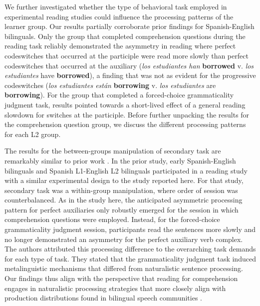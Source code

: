 \documentclass[output=paper,colorlinks,citecolor=brown]{langscibook}
\begin{document}
We further investigated whether the type of behavioral task employed in experimental reading studies could influence the processing patterns of the learner group. Our results partially corroborate prior findings for Spanish-English bilinguals. Only the group that completed comprehension questions during the reading task reliably demonstrated the asymmetry in reading where perfect codeswitches that occurred at the participle were read more slowly than perfect codeswitches that occurred at the auxiliary (\textit{los estudiantes han} \textbf{borrowed} v. \textit{los estudiantes} have \textbf{borrowed}), a finding that was not as evident for the progressive codeswitches (\textit{los estudiantes est\'an} \textbf{borrowing} v. \textit{los estudiantes} are \textbf{borrowing}). For the group that completed a forced-choice grammaticality judgment task, results pointed towards a short-lived effect of a general reading slowdown for switches at the participle. Before further unpacking the results for the comprehension question group, we discuss the different processing patterns for each L2 group.

The results for the between-groups manipulation of secondary task are remarkably similar to prior work \citep{ValdesKroffetal2018}. In the prior study, early Spanish-English bilinguals and Spanish L1-English L2 bilinguals participated in a reading study with a similar experimental design to the study reported here. For that study, secondary task was a within-group manipulation, where order of session was counterbalanced. As in the study here, the anticipated asymmetric processing pattern for perfect auxiliaries only robustly emerged for the session in which comprehension questions were employed. Instead, for the forced-choice grammaticality judgment session, participants read the sentences more slowly and no longer demonstrated an asymmetry for the perfect auxiliary verb complex. The authors attributed this processing difference to the overarching task demands for each type of task. They stated that the grammaticality judgment task induced metalinguistic mechanisms that differed from naturalistic sentence processing. Our findings thus align with the perspective that reading for comprehension engages in naturalistic processing strategies that more closely align with production distributions found in bilingual speech communities \citep{MacizoBajo2006}.
\end{document}
